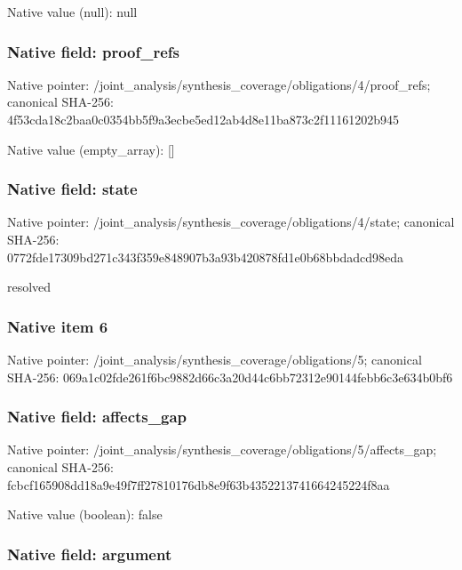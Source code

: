 \documentclass[10pt,a4paper]{article}
\begin{document}
Native value (null): null



\subsubsection{Native field: proof\_refs}


Native pointer: /joint\_analysis/synthesi\allowbreak{}s\_coverage/obligations/4\allowbreak{}/proof\_refs; canonical SHA-256: 4f53cda18c2baa0c0354bb5f\allowbreak{}9a3ecbe5ed12ab4d8e11ba87\allowbreak{}3c2f11161202b945



Native value (empty\_array): []



\subsubsection{Native field: state}


Native pointer: /joint\_analysis/synthesi\allowbreak{}s\_coverage/obligations/4\allowbreak{}/state; canonical SHA-256: 0772fde17309bd271c343f35\allowbreak{}9e848907b3a93b420878fd1e\allowbreak{}0b68bbdadcd98eda


resolved


\subsubsection{Native item 6}


Native pointer: /joint\_analysis/synthesi\allowbreak{}s\_coverage/obligations/5; canonical SHA-256: 069a1c02fde261f6bc9882d6\allowbreak{}6c3a20d44c6bb72312e90144\allowbreak{}febb6c3e634b0bf6



\subsubsection{Native field: affects\_gap}


Native pointer: /joint\_analysis/synthesi\allowbreak{}s\_coverage/obligations/5\allowbreak{}/affects\_gap; canonical SHA-256: fcbcf165908dd18a9e49f7ff\allowbreak{}27810176db8e9f63b4352213\allowbreak{}741664245224f8aa



Native value (boolean): false



\subsubsection{Native field: argument}
\end{document}
